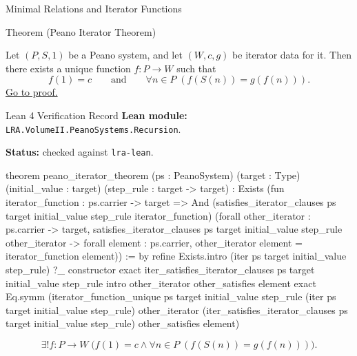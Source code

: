 \begin{topicbox}{Minimal Relations and Iterator Functions}
\begin{theorembox}{Theorem (Peano Iterator Theorem)}
\begin{theorem}
\label{thm:peano-iterator-theorem}
Let $(P,S,1)$ be a Peano system, and let $(W,c,g)$ be iterator data for it.
Then there exists a unique function $f:P\to W$ such that
\[
f(1)=c
\qquad\text{and}\qquad
\forall n\in P\;(f(S(n))=g(f(n))).
\]
\hyperref[prf:peano-iterator-theorem]{Go to proof.}
\end{theorem}
\end{theorembox}

\begin{formalizationrecord}{Lean 4 Verification Record}
\textbf{Lean module:} \texttt{LRA.VolumeII.PeanoSystems.Recursion}.\par
{}
\textbf{Status:} checked against \texttt{lra-lean}.\par

\begin{leancode}
theorem peano_iterator_theorem
    (ps : PeanoSystem)
    (target : Type)
    (initial_value : target)
    (step_rule : target -> target) :
    Exists (fun iterator_function : ps.carrier -> target =>
      And
        (satisfies_iterator_clauses
          ps target initial_value step_rule iterator_function)
        (forall other_iterator : ps.carrier -> target,
          satisfies_iterator_clauses
            ps target initial_value step_rule other_iterator ->
          forall element : ps.carrier,
            other_iterator element = iterator_function element)) := by
  refine
    Exists.intro
      (iter ps target initial_value step_rule)
      ?_
  constructor
  exact iter_satisfies_iterator_clauses ps target initial_value step_rule
  intro other_iterator other_satisfies element
  exact
    Eq.symm
      (iterator_function_unique
        ps target initial_value step_rule
        (iter ps target initial_value step_rule)
        other_iterator
        (iter_satisfies_iterator_clauses ps target initial_value step_rule)
        other_satisfies
        element)
\end{leancode}
\end{formalizationrecord}

\begin{remark*}
\[
\exists! f:P\to W\;
\bigl(f(1)=c\land \forall n\in P\;(f(S(n))=g(f(n)))\bigr).
\]
\end{remark*}


\end{topicbox}
